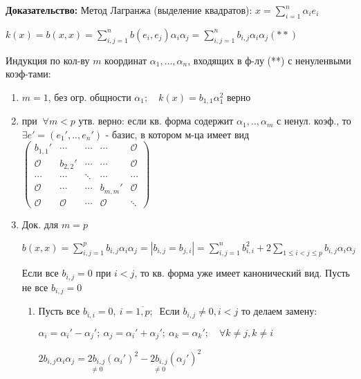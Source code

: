 \textbf{Доказательство: } Метод Лагранжа (выделение квадратов): $x = \sum\limits_{i=1}^n \alpha_i e_i$

$k(x) = b(x,x) = \sum\limits_{i,j=1}^n b(e_i, e_j) \alpha_i \alpha_j = \sum\limits_{i,j=1}^n b_{i,j} \alpha_i \alpha_j (**)$

Индукция по кол-ву $m$ координат $\alpha_1,\ldots,\alpha_n$, входящих в ф-лу (**) с ненуленвыми коэф-тами:
\begin{enumerate}
 \item $m=1$, без огр. общности $\alpha_1;\quad k(x) = b_{1,1} \alpha_1^2$ верно
 \item при $\ \forall m < p$ утв. верно: если кв. форма содержит $\alpha_1,..,\alpha_m$ с ненул. коэф., то\\ $\exists e' = (e_1',..,e_n')$ - базис, в котором м-ца имеет вид
$\begin{pmatrix}
  b_{1,1}' & \cdots & \cdots & \cdots & \mathcal{O} \\
  \mathcal{O} & b_{2,2}' & \cdots & \cdots & \mathcal{O} \\
  \cdots & \cdots & \ddots & \cdots & \cdots \\
  \mathcal{O} & \cdots & \cdots & b_{m,m}' & \mathcal{O} \\
  \mathcal{O} & \mathcal{O} & \cdots & \mathcal{O} & \ddots
 \end{pmatrix}
$
 \item Док. для $m=p$

$b(x,x) = \sum\limits_{i,j=1}^p b_{i,j} \alpha_i \alpha_j = | b_{i,j} = b_{j,i} | = \sum\limits_{i,j=1}^n b_{i,i}^2 + 2 \sum\limits_{1 \le i < j \le p} b_{i,j} \alpha_i \alpha_j$

Если все $b_{i,j}=0$ при $i<j$, то кв. форма уже имеет канонический вид.
Пусть не все $b_{i,j}=0$
\begin{enumerate}
 \item Пусть все $b_{i,i}=0,\ i=\overline{1,p};\ $ Если $b_{i,j} \ne 0, i<j$ то делаем замену:

    $\alpha_i = \alpha_i' - \alpha_j';\ \alpha_j = \alpha_i' + \alpha_j';\ \alpha_k = \alpha_k';\quad \forall k \ne j, k\ne i$

    $2b_{i,j}\alpha_i \alpha_j = \underset{\ne 0} {2b_{i,j}} (\alpha_i')^2 - \underset{\ne 0}{2b_{i,j}} (\alpha_j')^2$


\end{enumerate}
\end{enumerate}
